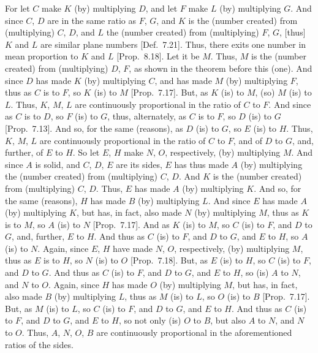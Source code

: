 \begin{Parallel}{}{}
{For let $C$ make $K$ (by) multiplying $D$, and let $F$ make $L$
(by) multiplying $G$. And since $C$, $D$ are in the same ratio as $F$, $G$,
and $K$ is the (number created) from (multiplying) $C$, $D$, and $L$ the (number created) from
(multiplying) $F$, $G$, [thus] $K$ and $L$ are  similar plane numbers [Def.~7.21]. Thus, there exits one number
in mean proportion to $K$ and $L$ [Prop.~8.18].
Let it be $M$. Thus, $M$ is the (number created) from (multiplying) $D$, $F$, as shown in the theorem before this (one). And since $D$ has made $K$ (by) multiplying $C$, and has made $M$ (by) multiplying $F$, thus as $C$ is to $F$, so
$K$ (is) to $M$ [Prop.~7.17]. But, as $K$ (is) to $M$, (so) $M$ (is) to $L$. Thus, $K$, $M$, $L$ are continuously
proportional in the ratio of $C$ to $F$. And since as $C$ is to $D$, so $F$
(is) to $G$, thus, alternately, as $C$ is to $F$, so $D$ (is) to $G$ [Prop.~7.13]. And so, for the same (reasons), 
as $D$ (is) to $G$, so $E$ (is) to $H$. Thus, $K$, $M$, $L$ are continuously
proportional in the ratio of $C$ to $F$, and of $D$ to $G$, and, further,  of $E$ to $H$. So let  $E$, $H$ make  $N$, $O$, respectively, (by) multiplying $M$. And since $A$ is  solid, and $C$, $D$, $E$ are its sides, $E$ has thus made $A$ (by) multiplying the (number created) from
(multiplying) $C$, $D$. And  $K$ 
is the (number created) from (multiplying)
$C$, $D$. Thus, $E$ has made $A$ (by) multiplying $K$. And so, for the
same (reasons), $H$ has made $B$ (by) multiplying $L$. And since
$E$ has made $A$ (by) multiplying $K$, but has, in fact, also made $N$ (by)
multiplying $M$, thus as $K$ is to $M$, so $A$ (is) to $N$ [Prop.~7.17].  And as $K$ (is) to $M$, so
$C$ (is) to $F$, and $D$ to $G$, and, further, $E$ to $H$. And thus as $C$
(is) to $F$, and $D$ to $G$, and $E$ to $H$, so $A$ (is) to $N$. Again, since
 $E$, $H$ have made  $N$, $O$, respectively, (by) multiplying $M$,
thus as $E$ is to $H$, so $N$ (is) to $O$ [Prop.~7.18]. But, as $E$ (is) to $H$, so $C$
(is) to $F$, and $D$ to $G$.  And thus as $C$ (is) to $F$, and $D$ to $G$,
and $E$ to $H$, so (is) $A$ to $N$, and $N$ to $O$. Again, since
$H$ has made $O$ (by) multiplying $M$, but  has, in fact, also made
$B$ (by) multiplying $L$, thus as $M$ (is) to $L$, so $O$ (is) to $B$ [Prop.~7.17]. But, as $M$ (is) to $L$, so $C$ (is)
to $F$, and $D$ to $G$, and $E$ to $H$. And thus as $C$ (is) to $F$,
and $D$ to $G$, and $E$ to $H$, so not only (is) $O$ to $B$, but
also $A$ to $N$, and $N$ to $O$. Thus,	 $A$, $N$, $O$, $B$ are continuously proportional in the aforementioned ratios of the sides.

}
\end{Parallel}
